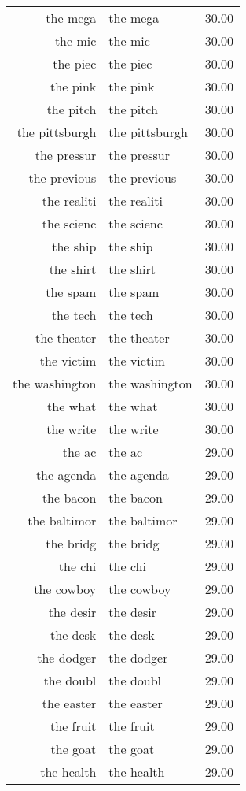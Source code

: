 \begin{table}[ht]
\begin{tabular}{rlr}
  the mega & the mega & 30.00 \\ 
  the mic & the mic & 30.00 \\ 
  the piec & the piec & 30.00 \\ 
  the pink & the pink & 30.00 \\ 
  the pitch & the pitch & 30.00 \\ 
  the pittsburgh & the pittsburgh & 30.00 \\ 
  the pressur & the pressur & 30.00 \\ 
  the previous & the previous & 30.00 \\ 
  the realiti & the realiti & 30.00 \\ 
  the scienc & the scienc & 30.00 \\ 
  the ship & the ship & 30.00 \\ 
  the shirt & the shirt & 30.00 \\ 
  the spam & the spam & 30.00 \\ 
  the tech & the tech & 30.00 \\ 
  the theater & the theater & 30.00 \\ 
  the victim & the victim & 30.00 \\ 
  the washington & the washington & 30.00 \\ 
  the what & the what & 30.00 \\ 
  the write & the write & 30.00 \\ 
  the ac & the ac & 29.00 \\ 
  the agenda & the agenda & 29.00 \\ 
  the bacon & the bacon & 29.00 \\ 
  the baltimor & the baltimor & 29.00 \\ 
  the bridg & the bridg & 29.00 \\ 
  the chi & the chi & 29.00 \\ 
  the cowboy & the cowboy & 29.00 \\ 
  the desir & the desir & 29.00 \\ 
  the desk & the desk & 29.00 \\ 
  the dodger & the dodger & 29.00 \\ 
  the doubl & the doubl & 29.00 \\ 
  the easter & the easter & 29.00 \\ 
  the fruit & the fruit & 29.00 \\ 
  the goat & the goat & 29.00 \\ 
  the health & the health & 29.00 \\ 

\end{tabular}
\end{table}
